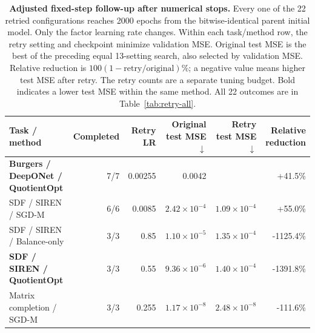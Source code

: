 \begin{table}[t]
\centering\small
\renewcommand{\arraystretch}{1.18}\setlength{\tabcolsep}{5pt}
\caption{\textbf{Adjusted fixed-step follow-up after numerical stops.} Every one of the 22 retried configurations reaches 2000 epochs from the bitwise-identical parent initial model. Only the factor learning rate changes. Within each task/method row, the retry setting and checkpoint minimize validation MSE. Original test MSE is the best of the preceding equal 13-setting search, also selected by validation MSE. Relative reduction is $100(1-\mathrm{retry}/\mathrm{original})\%$; a negative value means higher test MSE after retry. The retry counts are a separate tuning budget. Bold indicates a lower test MSE within the same method. All 22 outcomes are in Table~\ref{tab:retry-all}.}
\label{tab:retry-summary}
\begin{tabular}{@{}lrrrrr@{}}
\toprule
Task / method & Completed & Retry LR & Original test MSE $\downarrow$ & Retry test MSE $\downarrow$ & Relative reduction\\
\midrule
\rowcolor{oursbg}\textbf{Burgers / DeepONet / QuotientOpt} & 7/7 & 0.00255 & 0.0042 & \cellcolor{oursgoodbg}\textbf{\boldmath 0.0025} & +41.5\%\\
SDF / SIREN / SGD-M & 6/6 & 0.0085 & $2.42\!\times\!10^{-4}$ & \textbf{\boldmath $1.09\!\times\!10^{-4}$} & +55.0\%\\
SDF / SIREN / Balance-only & 3/3 & 0.85 & $1.10\!\times\!10^{-5}$ & $1.35\!\times\!10^{-4}$ & -1125.4\%\\
\rowcolor{oursbg}\textbf{SDF / SIREN / QuotientOpt} & 3/3 & 0.55 & $9.36\!\times\!10^{-6}$ & $1.40\!\times\!10^{-4}$ & -1391.8\%\\
Matrix completion / SGD-M & 3/3 & 0.255 & $1.17\!\times\!10^{-8}$ & $2.48\!\times\!10^{-8}$ & -111.6\%\\
\bottomrule
\end{tabular}
\end{table}
